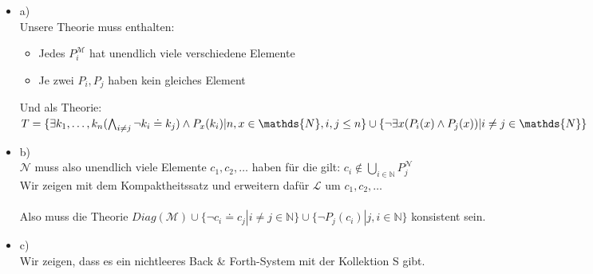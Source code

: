 \documentclass[a4paper]{scrartcl}%
\begin{document}
    \begin{itemize}
        \item a)\\
            Unsere Theorie muss enthalten:\\%
            \begin{itemize}
                \item Jedes $P_i^\mathcal{M}$ hat unendlich viele verschiedene Elemente\\
                \item Je zwei $P_i, P_j$ haben kein gleiches Element\\
            \end{itemize}
            Und als Theorie:\\
            $T = \{\exists k_1,\dots,k_n(\bigwedge_{i \neq j} \neg k_i \doteq k_j) \land P_x(k_i)| n,x \in \mathds{N}, i,j\leq n\}\\
            \cup \{\neg \exists x (P_i(x) \land P_j(x)) | i \neq j \in \mathds{N}\}$\\%

        \item b)\\
            $\mathcal{N}$ muss also unendlich viele Elemente $c_1, c_2,\dots$ haben für die gilt: $c_i \notin \bigcup_{i\in \mathds{N}}P_j^\mathcal{N}$\\
            Wir zeigen mit dem Kompaktheitssatz und erweitern dafür $ \mathscr{L} \text{ um } c_1,c_2,\dots$\\
            \\Also muss die Theorie $Diag(\mathcal{M}) \cup \{\neg c_i \doteq c_j | i\neq j \in \mathds{N}\} \cup \{\neg P_j(c_i) | j,i \in \mathds{N}\}$ konsistent sein.\\

        \item c)\\
            Wir zeigen, dass es ein nichtleeres Back \& Forth-System mit der Kollektion S gibt.\\%
            

\end{itemize}
\end{document}

